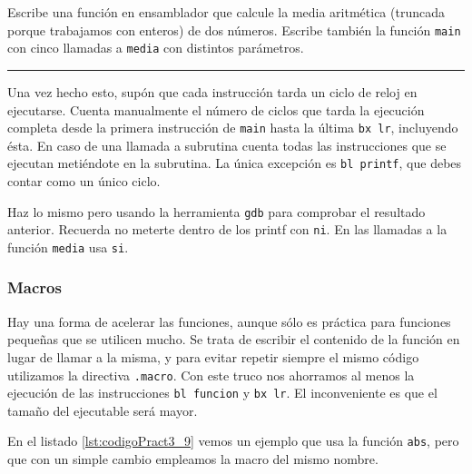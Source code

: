 Escribe una función en ensamblador que calcule la media aritmética (truncada porque
trabajamos con enteros) de dos números. Escribe también la función {\tt main} con 
cinco llamadas a {\tt media} con distintos parámetros.

\begin{center}
\begin{myfbox}
\small
\begin{minipage}{0.92\linewidth}
\begin{center}
\colorbox[gray]{1}{\rule{0cm}{4.5cm}\rule{11cm}{0cm}}
\end{center}
\end{minipage}
\end{myfbox}
\end{center}

Una vez hecho esto, supón que cada instrucción tarda un ciclo de reloj en ejecutarse.
Cuenta manualmente el número de ciclos que tarda la ejecución completa desde la primera
instrucción de {\tt main} hasta la última {\tt bx lr}, incluyendo ésta. En caso de una
llamada a subrutina cuenta todas las instrucciones que se ejecutan metiéndote en la
subrutina. La única excepción es {\tt bl printf}, que debes contar como un único ciclo.

Haz lo mismo pero usando la herramienta {\tt gdb} para comprobar el resultado anterior.
Recuerda no meterte dentro de los printf con {\tt ni}. En las llamadas a la función
{\tt media} usa {\tt si}.

\subsubsection{Macros}

Hay una forma de acelerar las funciones, aunque sólo es práctica para funciones pequeñas
que se utilicen mucho. Se trata de escribir el contenido de la función en lugar de
llamar a la misma, y para evitar repetir siempre el mismo código utilizamos la directiva
{\tt .macro}. Con este truco nos ahorramos al menos la ejecución de las instrucciones
{\tt bl funcion} y {\tt bx lr}. El inconveniente es que el tamaño del ejecutable será
mayor.

En el listado \ref{lst:codigoPract3_9} vemos un ejemplo que usa la función {\tt abs},
pero que con un simple cambio empleamos la macro del mismo nombre.

